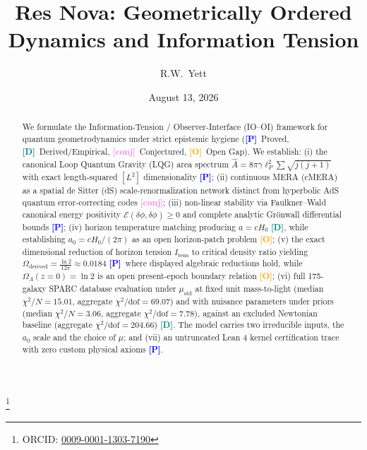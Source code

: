 \documentclass[aps,prd,twocolumn,superscriptaddress,nofootinbib,floatfix]{revtex4-2}
\newcommand{\tagP}{\textcolor{blue}{\textbf{[P]}}}
\newcommand{\tagD}{\textcolor{teal}{\textbf{[D]}}}
\newcommand{\tagC}{\textcolor{violet}{\textbf{[conj]}}}
\newcommand{\tagO}{\textcolor{orange}{\textbf{[O]}}}
\theoremstyle{plain}
\theoremstyle{definition}
\begin{document}
\title{Res Nova: Geometrically Ordered Dynamics and Information Tension}

\author{R.W.\ Yett}
\thanks{ORCID: \href{https://orcid.org/0009-0001-1303-7190}{0009-0001-1303-7190}}

\date{August 13, 2026}

\begin{abstract}
We formulate the Information-Tension / Observer-Interface (IO--OI) framework for quantum geometrodynamics under strict epistemic hygiene (\tagP~Proved, \tagD~Derived/Empirical, \tagC~Conjectured, \tagO~Open Gap). We establish: (i) the canonical Loop Quantum Gravity (LQG) area spectrum $\hat{A} = 8\pi \gamma \ell_P^2 \sum \sqrt{j(j+1)}$ with exact length-squared $[L^2]$ dimensionality \tagP; (ii) continuous MERA (cMERA) as a spatial de Sitter (dS) scale-renormalization network distinct from hyperbolic AdS quantum error-correcting codes \tagC; (iii) non-linear stability via Faulkner--Wald canonical energy positivity $\mathcal{E}(\delta\phi,\delta\phi) \ge 0$ and complete analytic Gr\"{o}nwall differential bounds \tagP; (iv) horizon temperature matching producing $a = c H_0$ \tagD, while establishing $a_0 = c H_0 / (2\pi)$ as an open horizon-patch problem \tagO; (v) the exact dimensional reduction of horizon tension $I_{\mathrm{tens}}$ to critical density ratio yielding $\Omega_{\mathrm{derived}} = \frac{\ln 2}{12\pi} \approx 0.0184$ \tagP\ where displayed algebraic reductions hold, while $\Omega_\Lambda(z=0) = \ln 2$ is an open present-epoch boundary relation \tagO; (vi) full 175-galaxy SPARC database evaluation under $\mu_{\mathrm{std}}$ at fixed unit mass-to-light (median $\chi^2/N = 15.01$, aggregate $\chi^2/\mathrm{dof} = 69.07$) and with nuisance parameters under priors (median $\chi^2/N = 3.06$, aggregate $\chi^2/\mathrm{dof} = 7.78$), against an excluded Newtonian baseline (aggregate $\chi^2/\mathrm{dof} = 204.66$) \tagD. The model carries two irreducible inputs, the $a_0$ scale and the choice of $\mu$; and (vii) an untruncated Lean 4 kernel certification trace with zero custom physical axioms \tagP.
\end{abstract}

\maketitle


\begin{center}
\end{center}
\bigskip
\end{document}
